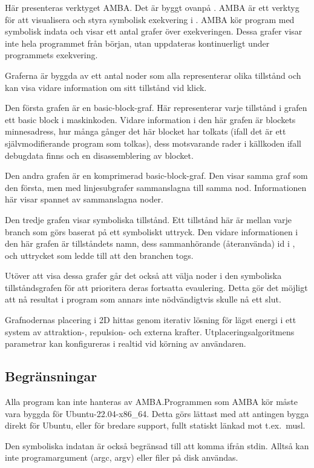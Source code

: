 \label{chap:amba}

Här presenteras verktyget AMBA. Det är byggt ovanpå \stoe. AMBA är ett
verktyg för att visualisera och styra symbolisk exekvering i \stoe.
AMBA kör program med symbolisk indata och visar ett antal grafer över
exekveringen. Dessa grafer visar inte hela programmet från början,
utan uppdateras kontinuerligt under programmets exekvering.

Graferna är byggda av ett antal noder som alla representerar olika
tillstånd och kan visa vidare information om sitt tillstånd vid klick.

Den första grafen är en basic-block-graf. Här representerar varje
tillstånd i grafen ett basic block i maskinkoden. Vidare information i
den här grafen är blockets minnesadress, hur många gånger det här
blocket har tolkats (ifall det är ett självmodifierande program som
tolkas), dess motsvarande rader i källkoden ifall debugdata finns och
en disassemblering av blocket.

Den andra grafen är en komprimerad basic-block-graf. Den visar samma
graf som den första, men med linjesubgrafer sammanslagna till samma
nod. Informationen här visar spannet av sammanslagna noder.

Den tredje grafen visar symboliska tillstånd. Ett tillstånd här är
mellan varje branch som görs baserat på ett symboliskt
uttryck. Den vidare informationen i den här grafen är tillståndets
namn, dess sammanhörande (återanvända) id i \stoe, och uttrycket som
ledde till att den branchen togs.

Utöver att visa dessa grafer går det också att välja noder i den
symboliska tillståndsgrafen för att prioritera deras fortsatta
evaulering. Detta gör det möjligt att nå resultat i program som annars
inte nödvändigtvis skulle nå ett slut.

Grafnodernas placering i 2D hittas genom iterativ lösning för lägst
energi i ett system av attraktion-, repulsion- och externa
krafter. Utplaceringsalgoritmens parametrar kan konfigureras i realtid
vid körning av användaren.

\subsection{Begränsningar}

Alla program kan inte hanteras av AMBA.\@ Programmen som AMBA kör måste
vara byggda för Ubuntu-22.04-x86\_64. Detta görs lättast med att
antingen bygga direkt för Ubuntu, eller för bredare support, fullt
statiskt länkad mot t.ex.\ musl.

Den symboliska indatan är också begränsad till att komma ifrån
stdin. Alltså kan inte programargument (argc, argv) eller filer på
disk användas.
